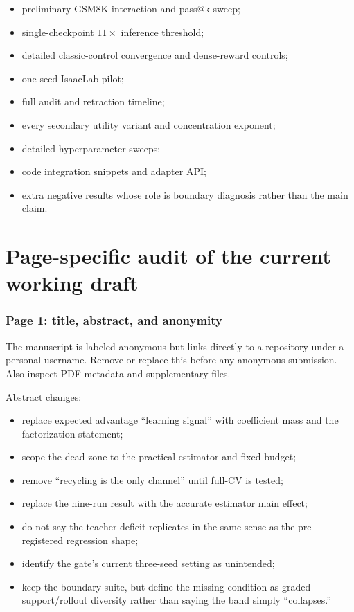 \documentclass[11pt]{article}
\theoremstyle{definition}
\theoremstyle{remark}
\begin{document}
\begin{itemize}[leftmargin=2em]
\item preliminary GSM8K interaction and pass@k sweep;
\item single-checkpoint $11\times$ inference threshold;
\item detailed classic-control convergence and dense-reward controls;
\item one-seed IsaacLab pilot;
\item full audit and retraction timeline;
\item every secondary utility variant and concentration exponent;
\item detailed hyperparameter sweeps;
\item code integration snippets and adapter API;
\item extra negative results whose role is boundary diagnosis rather than the main claim.
\end{itemize}

\part{Page-specific audit of the current working draft}

\section{Page 1: title, abstract, and anonymity}

\begin{prioritybox}
The manuscript is labeled anonymous but links directly to a repository under a personal username. Remove or replace this before any anonymous submission. Also inspect PDF metadata and supplementary files.
\end{prioritybox}

Abstract changes:

\begin{itemize}[leftmargin=2em]
\item replace expected advantage ``learning signal'' with coefficient mass and the factorization statement;
\item scope the dead zone to the practical estimator and fixed budget;
\item remove ``recycling is the only channel'' until full-CV is tested;
\item replace the nine-run result with the accurate estimator main effect;
\item do not say the teacher deficit replicates in the same sense as the pre-registered regression shape;
\item identify the gate's current three-seed setting as unintended;
\item keep the boundary suite, but define the missing condition as graded support/rollout diversity rather than saying the band simply ``collapses.''
\end{itemize}
\end{document}
